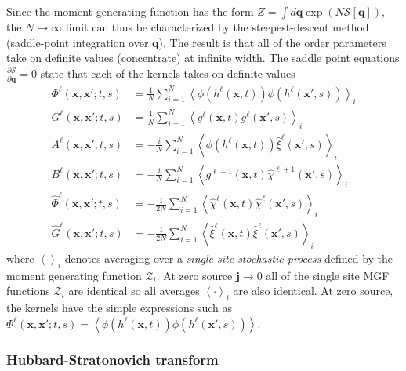 \documentclass{article} %
\def\x{\bm x}
\begin{document}
Since the moment generating function has the form $Z = \int d\bm q \exp\left( N \mathcal S[\bm q] \right)$, the $N \to \infty$ limit can thus be characterized by the steepest-descent method (saddle-point integration over $\bm q$). The result is that all of the order parameters take on definite values (concentrate) at infinite width. The saddle point equations $\frac{\partial \mathcal S}{\partial \bm q} = 0$ state that each of the kernels takes on definite values
\begin{align}
    \Phi^\ell(\x,\x';t,s) &= \frac{1}{N} \sum_{i=1}^N \left< \phi(h^\ell(\x,t)) \phi(h^\ell(\x',s) ) \right>_{i} \nonumber
    \\ 
    G^\ell(\x,\x';t,s) &= \frac{1}{N} \sum_{i=1}^N \left< g^\ell(\x,t) g^\ell(\x',s) \right>_{i} \nonumber
    \\
    A^\ell(\x,\x';t,s) &=- \frac{i}{N} \sum_{i=1}^N \left< \phi(h^\ell(\x,t)) \hat \xi^\ell(\x',s)   \right>_i \nonumber 
    \\ 
    B^\ell(\x,\x';t,s) &= - \frac{i}{N} \sum_{i=1}^N \left< g^{\ell+1}(\x,t)  \hat\chi^{\ell+1}(\x',s)   \right>_i \nonumber
    \\
    \hat \Phi^\ell(\x,\x';t,s) &= - \frac{1}{2 N} \sum_{i=1}^N \left< \hat\chi^{\ell}(\x,t) \hat\chi^\ell(\x',s) \right>_{i} \nonumber
    \\ 
    \hat G^\ell(\x,\x';t,s) &= -  \frac{1}{2 N} \sum_{i=1}^N \left< \hat\xi^{\ell}(\x,t) \hat\xi^\ell(\x',s) \right>_{i}
\end{align}
where $\left< \right>_i$ denotes averaging over a \textit{single site stochastic process} defined by the moment generating function $\mathcal Z_i$. At zero source $\bm j \to 0$ all of the single site MGF functions $\mathcal Z_i$ are identical so all averages $\left< \cdot \right>_i$ are also identical. At zero source, the kernels have the simple expressions such as $\Phi^\ell(\x,\x';t,s) =  \left< \phi(h^\ell(\x,t)) \phi(h^\ell(\x',s) ) \right>$. 

\subsubsection{Hubbard-Stratonovich transform}
\end{document}
